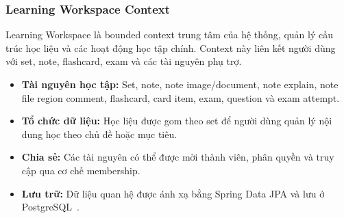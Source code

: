 \subsubsection{Learning Workspace Context}
\label{subsubsec:learning-workspace-context}

Learning Workspace là bounded context trung tâm của hệ thống, quản lý cấu trúc học liệu và các hoạt động học tập chính. Context này liên kết người dùng với set, note, flashcard, exam và các tài nguyên phụ trợ.

\begin{itemize}
    \item \textbf{Tài nguyên học tập:} Set, note, note image/document, note explain, note file region comment, flashcard, card item, exam, question và exam attempt.
    \item \textbf{Tổ chức dữ liệu:} Học liệu được gom theo set để người dùng quản lý nội dung học theo chủ đề hoặc mục tiêu.
    \item \textbf{Chia sẻ:} Các tài nguyên có thể được mời thành viên, phân quyền và truy cập qua cơ chế membership.
    \item \textbf{Lưu trữ:} Dữ liệu quan hệ được ánh xạ bằng Spring Data JPA và lưu ở PostgreSQL~\cite{springdatajpa,postgresqlabout}.
\end{itemize}